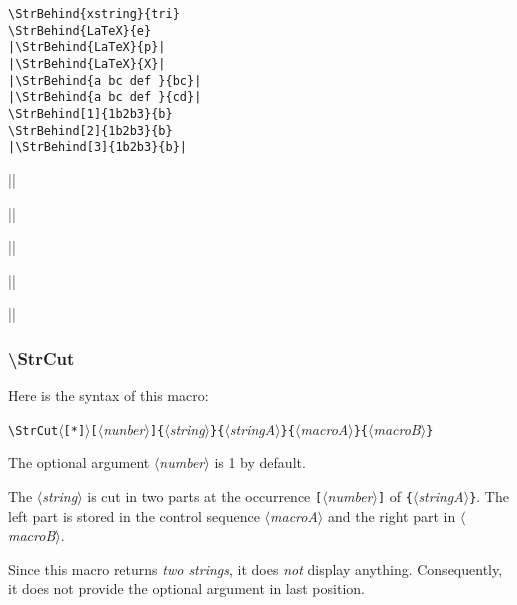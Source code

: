 \documentclass[a4paper,10pt]{article}
\newcommand\argu[1]{$\langle$\textit{#1}$\rangle$}
\newcommand\ARGU[1]{\texttt{\{}\argu{#1}\texttt{\}}}
\newcommand\arguC[1]{\texttt{[}\argu{#1}\texttt{]}}
\newcommand\etoile{$\langle$\texttt{[*]}$\rangle$}
\newcommand\styleexemple{\small\vskip4pt}
\newcommand\verbinline{\lstinline[basicstyle=\normalsize\ttfamily]}
\begin{document}
\begin{minipage}[t]{0.65\linewidth}
\begin{lstlisting}
\StrBehind{xstring}{tri}
\StrBehind{LaTeX}{e}
|\StrBehind{LaTeX}{p}|
|\StrBehind{LaTeX}{X}|
|\StrBehind{a bc def }{bc}|
|\StrBehind{a bc def }{cd}|
\StrBehind[1]{1b2b3}{b}
\StrBehind[2]{1b2b3}{b}
|\StrBehind[3]{1b2b3}{b}|
\end{lstlisting}%
\end{minipage}\hfill
\begin{minipage}[t]{0.35\linewidth}
	\styleexemple
	\par
	\par
	||\par
	||\par
	||\par
	||\par
	\par
	\par
	||
\end{minipage}%

\subsubsection{\ttfamily\textbackslash StrCut}
Here is the syntax of this macro:\par\nobreak\smallskip
\verbinline|\StrCut|\etoile\arguC{nunber}\ARGU{string}\ARGU{stringA}\ARGU{macroA}\ARGU{macroB}
\smallskip

The optional argument \argu{number} is 1 by default.\par\nobreak\smallskip
The \argu{string} is cut in two parts at the occurrence \no\arguC{number} of \ARGU{stringA}. The left part is stored in the control sequence \argu{macroA} and the right part in \argu{macroB}.

Since this macro returns \emph{two strings}, it does \emph{not} display anything. Consequently, it does not provide the optional argument in last position.\medskip
\end{document}
